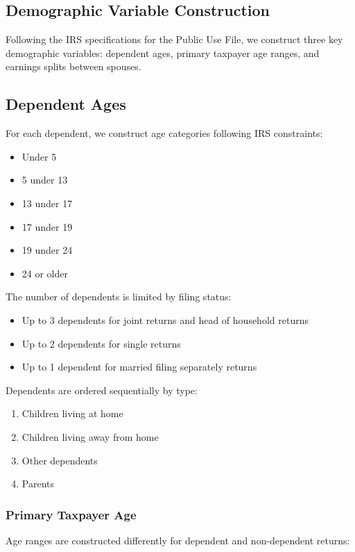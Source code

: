 \subsection{Demographic Variable Construction}

Following the IRS specifications for the Public Use File, we construct three key demographic variables: dependent ages, primary taxpayer age ranges, and earnings splits between spouses.

\subsection{Dependent Ages}

For each dependent, we construct age categories following IRS constraints:
\begin{itemize}
    \item Under 5
    \item 5 under 13 
    \item 13 under 17
    \item 17 under 19
    \item 19 under 24
    \item 24 or older
\end{itemize}

The number of dependents is limited by filing status:
\begin{itemize}
    \item Up to 3 dependents for joint returns and head of household returns
    \item Up to 2 dependents for single returns
    \item Up to 1 dependent for married filing separately returns
\end{itemize}

Dependents are ordered sequentially by type:
\begin{enumerate}
    \item Children living at home
    \item Children living away from home
    \item Other dependents
    \item Parents
\end{enumerate}

\subsubsection{Primary Taxpayer Age}

Age ranges are constructed differently for dependent and non-dependent returns:

